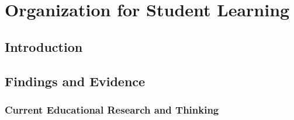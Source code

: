 \section{Organization for Student Learning}
\subsection{Introduction}
\blindtext
\subsection{Findings and Evidence}
\subsubsection{Current Educational Research and Thinking}
\begin{Parallel}{0.74\textwidth}{0.24\textwidth}
\ParallelLText{
\Findings

\blindtext

\blindtext
}

\ParallelPar
\bigskip
\ParallelLText{
\Findings

\blindtext

\blindtext
}

\end{Parallel}
\show\ParallelPar
\show\long
